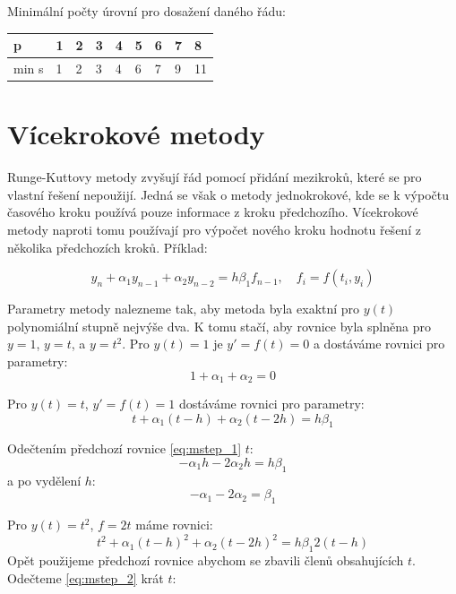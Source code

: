 \documentclass[a4paper, 12pt]{book}
\theoremstyle{definition}
\begin{document}
Minimální počty úrovní pro dosažení daného řádu:
\begin{center}
\begin{tabular}{l|llllllll}
p & 1 & 2 & 3 & 4 & 5 & 6 & 7 & 8\\
\hline
min s & 1 & 2 & 3 & 4 & 6 & 7 & 9 & 11
\end{tabular}
\end{center}


\section{Vícekrokové metody}

Runge-Kuttovy metody zvyšují řád pomocí přidání mezikroků, které se pro vlastní řešení nepoužijí. Jedná se však o metody jednokrokové, kde se 
k výpočtu časového kroku používá pouze informace z kroku předchozího.  Vícekrokové metody naproti tomu používají pro výpočet nového kroku 
hodnotu řešení z několika předchozích kroků. Příklad:

\[
    y_n + \alpha_1 y_{n-1} + \alpha_2 y_{n-2} = h \beta_1 f_{n-1},\quad f_i = f(t_i, y_i)
\]

Parametry metody nalezneme tak, aby metoda byla exaktní pro $y(t)$ polynomiální stupně nejvýše dva. K tomu stačí, aby rovnice byla splněna pro $y=1$, $y=t$, a $y=t^2$.
Pro $y(t)=1$ je $y' = f(t) = 0$ a dostáváme rovnici pro parametry:
\begin{equation}
    \label{eq:mstep_1}
    1 + \alpha_1 + \alpha_2 = 0 
\end{equation}

Pro $y(t)=t$, $y'=f(t)=1$ dostáváme rovnici pro parametry:
\begin{equation}
\label{eq:mstep_2}
    t + \alpha_1 (t-h)  + \alpha_2(t-2h) = h\beta_1  
\end{equation}

Odečtením předchozí rovnice \eqref{eq:mstep_1} $t$:
\[
 -\alpha_1 h -2\alpha_2 h = h \beta_1
\]
a po vydělení $h$:
\begin{equation}
\label{eq:mstep_3}
   -\alpha_1  -2\alpha_2  = \beta_1
\end{equation}


Pro $y(t)=t^2$, $f=2t$ máme rovnici:
\[
    t^2 + \alpha_1 (t-h)^2 + \alpha_2(t-2h)^2 = h\beta_1 2(t-h)
\]
Opět použijeme předchozí rovnice abychom se zbavili členů obsahujících $t$.
Odečteme \eqref{eq:mstep_2} krát $t$:
\end{document}
